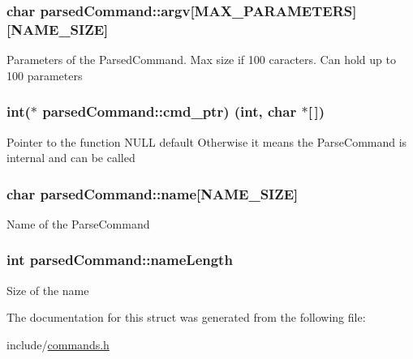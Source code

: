 \subsubsection[{\texorpdfstring{argv}{argv}}]{\setlength{\rightskip}{0pt plus 5cm}char parsed\+Command\+::argv\mbox{[}M\+A\+X\+\_\+\+P\+A\+R\+A\+M\+E\+T\+E\+RS\mbox{]}\mbox{[}N\+A\+M\+E\+\_\+\+S\+I\+ZE\mbox{]}}\hypertarget{structparsedCommand_a41f05153a28973b8327b5dd8d2c5b064}{}\label{structparsedCommand_a41f05153a28973b8327b5dd8d2c5b064}
Parameters of the Parsed\+Command. Max size if 100 caracters. Can hold up to 100 parameters 
\subsubsection[{\texorpdfstring{cmd\+\_\+ptr}{cmd_ptr}}]{\setlength{\rightskip}{0pt plus 5cm}int($\ast$ parsed\+Command\+::cmd\+\_\+ptr) (int, char $\ast$\mbox{[}$\,$\mbox{]})}\hypertarget{structparsedCommand_a51be8726adae8deeb2ea625a11504234}{}\label{structparsedCommand_a51be8726adae8deeb2ea625a11504234}
Pointer to the function N\+U\+LL default Otherwise it means the Parse\+Command is internal and can be called 
\subsubsection[{\texorpdfstring{name}{name}}]{\setlength{\rightskip}{0pt plus 5cm}char parsed\+Command\+::name\mbox{[}N\+A\+M\+E\+\_\+\+S\+I\+ZE\mbox{]}}\hypertarget{structparsedCommand_aec09a148c5dd11208e7b10d55a8f7d10}{}\label{structparsedCommand_aec09a148c5dd11208e7b10d55a8f7d10}
Name of the Parse\+Command 
\subsubsection[{\texorpdfstring{name\+Length}{nameLength}}]{\setlength{\rightskip}{0pt plus 5cm}int parsed\+Command\+::name\+Length}\hypertarget{structparsedCommand_aa033e89de347318fe68eec79f7474a15}{}\label{structparsedCommand_aa033e89de347318fe68eec79f7474a15}
Size of the name 

The documentation for this struct was generated from the following file\+:\begin{DoxyCompactItemize}
\item 
include/\hyperlink{commands_8h}{commands.\+h}\end{DoxyCompactItemize}
